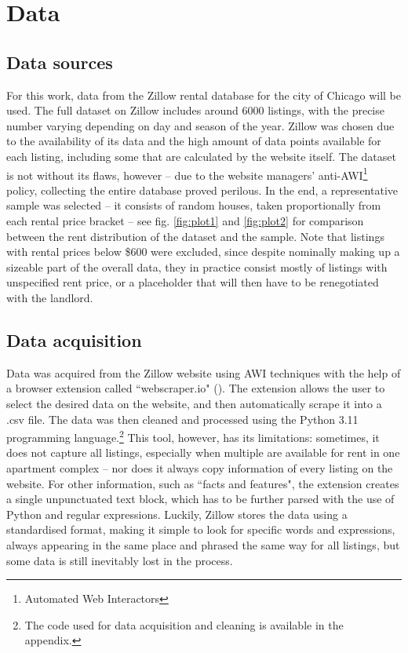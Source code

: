 \documentclass[12pt]{report}
\begin{document}
\section{Data}

\subsection{Data sources}

For this work, data from the Zillow rental database for the city of Chicago will be used. The full dataset on Zillow includes around 6000 listings, with the precise number varying depending on day and season of the year. Zillow was chosen due to the availability of its data and the high amount of data points available for each listing, including some that are calculated by the website itself. The dataset is not without its flaws, however -- due to the website managers' anti-AWI\footnote{Automated Web Interactors} policy, collecting the entire database proved perilous. In the end, a representative sample was selected -- it consists of random houses, taken proportionally from each rental price bracket -- see fig. \ref{fig:plot1} and \ref{fig:plot2} for comparison between the rent distribution of the dataset and the sample. Note that listings with rental prices below \$600 were excluded, since despite nominally making up a sizeable part of the overall data, they in practice consist mostly of listings with unspecified rent price, or a placeholder that will then have to be renegotiated with the landlord.

\subsection{Data acquisition}
Data was acquired from the Zillow website using AWI techniques with the help of a browser extension called ``webscraper.io" (\cite{webscraper}). The extension allows the user to select the desired data on the website, and then automatically scrape it into a .csv file. The data was then cleaned and processed using the Python 3.11 programming language.\footnote{The code used for data acquisition and cleaning is available in the appendix.} This tool, however, has its limitations: sometimes, it does not capture all listings, especially when multiple are available for rent in one apartment complex -- nor does it always copy information of every listing on the website. For other information, such as ``facts and features", the extension creates a single unpunctuated text block, which has to be further parsed with the use of Python and regular expressions. Luckily, Zillow stores the data using a standardised format, making it simple to look for specific words and expressions, always appearing in the same place and phrased the same way for all listings, but some data is still inevitably lost in the process.
\end{document}
